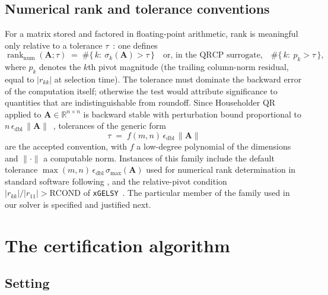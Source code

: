 \documentclass[11pt,a4paper]{article}
\theoremstyle{definition}
\newcommand{\R}{\mathbb{R}}
\newcommand{\eps}{\epsilon_{\mathrm{dbl}}}
\newcommand{\rankn}{\operatorname{rank}_{\mathrm{num}}}
\begin{document}
\subsection{Numerical rank and tolerance conventions}

For a matrix stored and factored in floating-point arithmetic, rank is
meaningful only relative to a tolerance
$\tau$~\cite[\S5.4.1]{golubvanloan2013}: one defines
\begin{equation}
  \rankn(\bm A;\tau)
  \;=\;
  \#\{\,k:\ \sigma_{k}(\bm A)>\tau\,\}
  \quad\text{or, in the QRCP surrogate,}\quad
  \#\{\,k:\ p_{k}>\tau\,\},
  \label{eq:numrank}
\end{equation}
where $p_{k}$ denotes the $k$th pivot magnitude (the trailing
column-norm residual, equal to $|r_{kk}|$ at selection time). The
tolerance must dominate the backward error of the computation itself;
otherwise the test would attribute significance to quantities that are
indistinguishable from roundoff. Since Householder QR applied to
$\bm A\in\R^{n\times n}$ is backward stable with perturbation bound
proportional to $n\,\eps\,\|\bm A\|$~\cite[Thm.~19.4]{higham2002},
tolerances of the generic form
\begin{equation}
  \tau \;=\; f(m,n)\,\eps\,\|\bm A\|
  \label{eq:tolfamily}
\end{equation}
are the accepted convention, with $f$ a low-degree polynomial of the
dimensions and $\|\cdot\|$ a computable norm. Instances of this
family include the default tolerance
$\max(m,n)\,\eps\,\sigma_{\max}(\bm A)$ used for numerical rank
determination in standard software following
\cite[\S5.4.1]{golubvanloan2013}, and the relative-pivot condition
$|r_{kk}|/|r_{11}|>\mathrm{RCOND}$ of
\texttt{xGELSY}~\cite{lapack1999}. The particular member of the
family used in our solver is specified and justified next.

\section{The certification algorithm}
\label{sec:algorithm}

\subsection{Setting}
\end{document}
